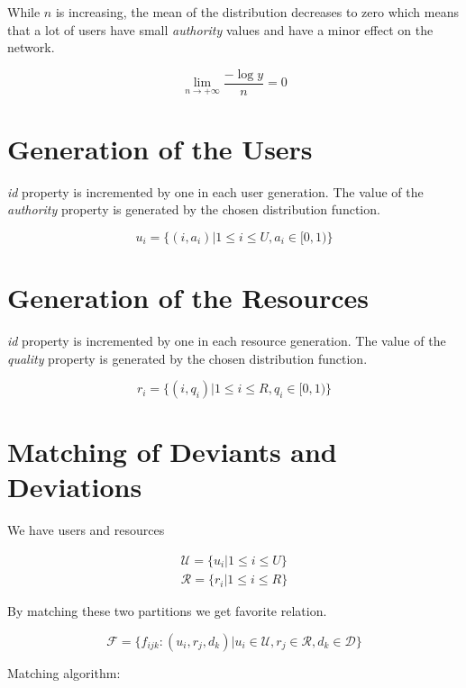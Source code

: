 \documentclass[12pt,a4paper]{report}
\begin{document}
	While $n$ is increasing, the mean of the distribution decreases to zero which means that  a lot of users have small \emph{authority} values and have a minor effect on the network.

	$$\lim_{n \to +\infty} \frac{-\log y}{n} = 0 $$

	\clearpage

\section{Generation of the Users}

	\hspace{0.6cm}\emph{id} property is incremented by one in each user generation. The value of the \emph{authority} property is generated by the chosen distribution function.

	$$u_{i} = \{(i, a_{i})| 1 \le i \le U, a_{i} \in [0,1) \} $$  

\section{Generation of the Resources}

	\hspace{0.6cm}\emph{id} property is incremented by one in each resource generation. The value of the \emph{quality} property is generated by the chosen distribution function.

	$$r_{i} = \{(i, q_{i})| 1 \le i \le R, q_{i} \in [0,1) \} $$  

\section{Matching of Deviants and Deviations}	
	
	\hspace{0.6cm}We have users and resources

	\begin{eqnarray*}
	\mathcal{U} = \{u_{i}|1 \le i \le U\}\\
	\mathcal{R} = \{r_{i}|1 \le i \le R\}
	\end{eqnarray*}

	By matching these two partitions we get favorite relation. 

	$$\mathcal{F} = \{f_{ijk} : (u_{i}, r_{j}, d_{k})| u_{i} \in \mathcal{U}, r_{j} \in \mathcal{R}, d_{k} \in \mathcal {D}\} $$

\clearpage

	\large{Matching algorithm:} 
	
\end{document}

